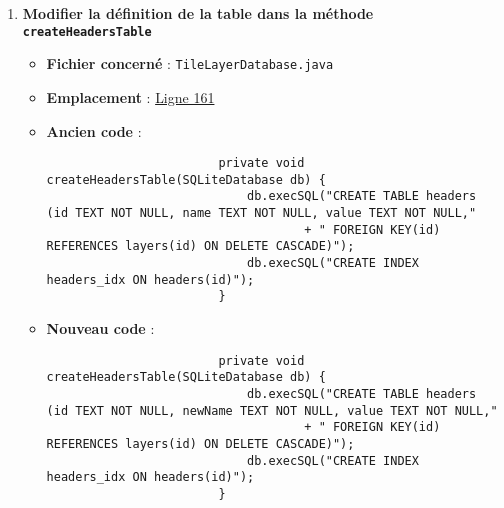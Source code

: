 \begin{enumerate}
    \item \textbf{Modifier la définition de la table dans la méthode \texttt{createHeadersTable}}
          \begin{itemize}
              \item \textbf{Fichier concerné} : \texttt{TileLayerDatabase.java}
              \item \textbf{Emplacement} :
                    \href{https://github.com/MarcusWolschon/osmeditor4android/blob/dcabe8084aa15f5551a37c990516bf73398af1bf/src/main/java/de/blau/android/resources/TileLayerDatabase.java#L161}{Ligne 161}
              \item \textbf{Ancien code} :
                    \begin{verbatim}
                        private void createHeadersTable(SQLiteDatabase db) {
                            db.execSQL("CREATE TABLE headers (id TEXT NOT NULL, name TEXT NOT NULL, value TEXT NOT NULL,"
                                    + " FOREIGN KEY(id) REFERENCES layers(id) ON DELETE CASCADE)");
                            db.execSQL("CREATE INDEX headers_idx ON headers(id)");
                        }
                    \end{verbatim}
              \item \textbf{Nouveau code} :
                    \begin{verbatim}
                        private void createHeadersTable(SQLiteDatabase db) {
                            db.execSQL("CREATE TABLE headers (id TEXT NOT NULL, newName TEXT NOT NULL, value TEXT NOT NULL,"
                                    + " FOREIGN KEY(id) REFERENCES layers(id) ON DELETE CASCADE)");
                            db.execSQL("CREATE INDEX headers_idx ON headers(id)");
                        }
                    \end{verbatim}
          \end{itemize}
\end{enumerate}